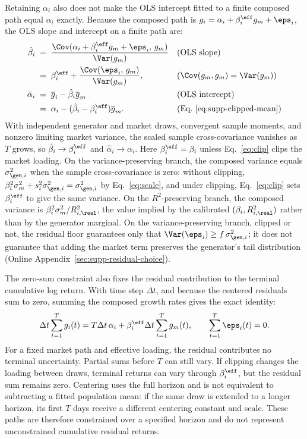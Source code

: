 Retaining $\alpha_i$ also does not make the OLS intercept fitted to a
finite composed path equal $\alpha_i$ exactly. Because the composed
path is $g_i = \alpha_i + \beta_i^{\eff} g_m + \eps_i$, the OLS slope
and intercept on a finite path are:
\begin{align}
  \hat\beta_i
    &\;=\; \frac{\Cov(\alpha_i + \beta_i^{\eff} g_m + \eps_i,\, g_m)}{\Var(g_m)}
    && \text{(OLS slope)} \notag \\
    &\;=\; \beta_i^{\eff} + \frac{\Cov(\eps_i,\, g_m)}{\Var(g_m)},
    && \text{($\Cov(g_m, g_m) = \Var(g_m)$)} \notag \\
  \hat\alpha_i
    &\;=\; \overline{g}_i-\hat\beta_i\overline{g}_m
    && \text{(OLS intercept)} \notag \\
    &\;=\; \alpha_i-(\hat\beta_i-\beta_i^{\eff})\overline{g}_m.
    && \text{(Eq.~\eqref{eq:supp-clipped-mean})}
\end{align}
With independent generator and market draws, convergent sample
moments, and nonzero limiting market variance, the scaled sample
cross-covariance vanishes as $T$ grows, so $\hat\beta_i \to \beta_i^{\eff}$ and
$\hat\alpha_i \to \alpha_i$. Here $\beta_i^{\eff}=\beta_i$ unless
Eq.~\eqref{eq:clip} clips the market loading. On the
variance-preserving branch, the composed variance equals
$\sigma_{\gen,i}^2$ when the sample cross-covariance is zero: without
clipping, $\beta_i^2 \sigma_m^2 + s_i^2 \sigma_{\gen,i}^2 =
\sigma_{\gen,i}^2$ by Eq.~\eqref{eq:scale}, and under clipping,
Eq.~\eqref{eq:clip} sets $\beta_i^{\eff}$ to give the same variance.
On the $R^2$-preserving branch, the composed variance is
$\beta_i^2 \sigma_m^2 / R^2_{i,\real}$, the value implied by the
calibrated $(\beta_i, R^2_{i,\real})$ rather than by the generator
marginal. On the variance-preserving branch, clipped or not, the
residual floor guarantees only that $\Var(\eps_i)\geq
f\,\sigma_{\gen,i}^2$; it does not guarantee that adding the market
term preserves the generator's tail distribution (Online
Appendix~\ref{sec:supp-residual-choice}).

The zero-sum constraint also fixes the residual contribution to the
terminal cumulative log return. With time step $\Delta t$, and because
the centered residuals sum to zero, summing the composed growth rates
gives the exact identity:
\begin{equation}
  \Delta t\sum_{t=1}^{T} g_i(t)
  = T\Delta t\,\alpha_i
    + \beta_i^{\eff}\Delta t\sum_{t=1}^{T}g_m(t),
  \qquad \sum_{t=1}^{T}\eps_i(t)=0.
  \label{eq:supp-zero-sum-terminal}
\end{equation}
For a fixed market path and effective loading, the residual contributes
no terminal uncertainty. Partial sums before $T$ can still vary. If
clipping changes the loading between draws, terminal returns can vary
through $\beta_i^{\eff}$, but the residual sum remains zero. Centering
uses the full horizon and is not equivalent to subtracting a fitted
population mean: if the same draw is extended to a longer horizon, its
first $T$ days receive a different centering constant and scale. These
paths are therefore constrained over a specified horizon and do not
represent unconstrained cumulative residual returns.

